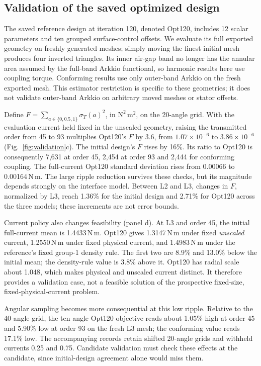 \documentclass{anvil-paper}
\begin{document}
\subsection{Validation of the saved optimized design}\label{sec:opt120}
The saved reference design at iteration 120, denoted Opt120, includes
12 scalar parameters and ten grouped surface-control offsets. We evaluate
its full exported geometry on freshly generated meshes; simply moving
the finest initial mesh produces four inverted triangles. Its inner
air-gap band no longer has the annular area assumed by the full-band
Arkkio functional, so harmonic results here use coupling torque.
Conforming results use only outer-band Arkkio on the fresh exported mesh.
This estimator restriction is specific to these geometries; it does not
validate outer-band Arkkio on arbitrary moved meshes or stator offsets.

Define $F=\sum_{a\in\{0,0.5,1\}}\sigma_T(a)^2$, in
$\mathrm{N^2\,m^2}$, on the 20-angle grid. With the evaluation current
held fixed in the unscaled geometry, raising the transmitted order from
45 to 93 multiplies Opt120's $F$ by 3.6, from $1.07\times10^{-6}$ to
$3.86\times10^{-6}$ (Fig.~\ref{fig:validation}c). The initial design's
$F$ rises by 16\%. Its ratio to Opt120 is consequently 7,631 at order 45,
2,454 at order 93 and 2,444 for conforming coupling. The full-current
Opt120 standard deviation rises from 0.00066 to 0.00164\,N\,m.
The large ripple reduction survives these checks, but its magnitude
depends strongly on the interface model. Between L2 and L3, changes in
$F$, normalized by L3, reach 1.36\% for the initial design and 2.71\%
for Opt120 across the three models; these increments are not error bounds.

Current policy also changes feasibility (panel d). At L3 and order 45,
the initial full-current mean is 1.4433\,N\,m. Opt120 gives 1.3147\,N\,m
under fixed \emph{unscaled} current, 1.2550\,N\,m under fixed physical
current, and 1.4983\,N\,m under the reference's fixed group-1 density rule.
The first two are 8.9\% and 13.0\% below the initial mean; the density-rule
value is 3.8\% above it. Opt120 has radial scale about 1.048, which makes
physical and unscaled current distinct. It therefore provides a
validation case, not a feasible solution of the prospective fixed-size,
fixed-physical-current problem.

Angular sampling becomes more consequential at this low ripple. Relative
to the 40-angle grid, the ten-angle Opt120 objective reads about 1.05\%
high at order 45 and 5.90\% low at order 93 on the fresh L3 mesh; the
conforming value reads 17.1\% low. The accompanying records retain shifted
20-angle grids and withheld currents 0.25 and 0.75. Candidate validation
must check these effects at the candidate, since initial-design agreement
alone would miss them.
\end{document}
